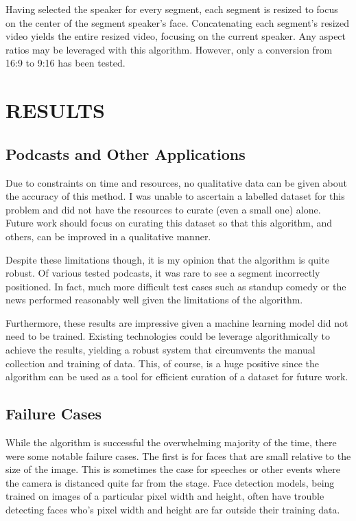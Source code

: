 \documentclass{article}
\begin{document}
Having selected the speaker for every segment, each segment is resized to focus on the center of the segment speaker's face. Concatenating each segment's resized video yields the entire resized video, focusing on the current speaker. Any aspect ratios may be leveraged with this algorithm. However, only a conversion from 16:9 to 9:16 has been tested.

\section{RESULTS}
\label{sec:majhead}

\subsection{Podcasts and Other Applications}
\label{ssec:podcasts-and-other-applications}

Due to constraints on time and resources, no qualitative data can be given about the accuracy of this method. I was unable to ascertain a labelled dataset for this problem and did not have the resources to curate (even a small one) alone. Future work should focus on curating this dataset so that this algorithm, and others, can be improved in a qualitative manner.

Despite these limitations though, it is my opinion that the algorithm is quite robust. Of various tested podcasts, it was rare to see a segment incorrectly positioned. In fact, much more difficult test cases such as standup comedy or the news performed reasonably well given the limitations of the algorithm.

Furthermore, these results are impressive given a machine learning model did not need to be trained. Existing technologies could be leverage algorithmically to achieve the results, yielding a robust system that circumvents the manual collection and training of data. This, of course, is a huge positive since the algorithm can be used as a tool for efficient curation of a dataset for future work.

\subsection{Failure Cases}
\label{ssec:failure-cases}

While the algorithm is successful the overwhelming majority of the time, there were some notable failure cases. The first is for faces that are small relative to the size of the image. This is sometimes the case for speeches or other events where the camera is distanced quite far from the stage. Face detection models, being trained on images of a particular pixel width and height, often have trouble detecting faces who's pixel width and height are far outside their training data.
\end{document}
